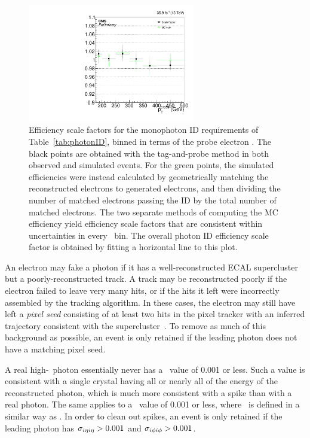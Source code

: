 \begin{figure}[hbtp]
  \begin{center}
    \includegraphics[width=0.65\textwidth]{Figures/phoID_SF.pdf}
    \caption{
    Efficiency scale factors for the monophoton ID requirements of Table~\ref{tab:photonID}, binned in terms of the probe electron \pT. The black points are obtained with the tag-and-probe method in
    both observed and simulated events. For the green points, the simulated efficiencies were instead calculated by geometrically matching the reconstructed electrons to generated electrons,
    and then dividing the number of matched electrons passing the ID by the total number of matched electrons. The two separate methods of computing the MC efficiency yield
    efficiency scale factors that are consistent within uncertainties in every \pT\ bin. The overall photon ID efficiency scale factor is obtained by fitting a horizontal line to this plot.
    }
    \label{fig:phoID_SF}
  \end{center}
\end{figure}

An electron may fake a photon if it has a well-reconstructed ECAL supercluster but a poorly-reconstructed track. A track may be reconstructed poorly if the electron failed to leave very many hits,
or if the hits it left were incorrectly assembled by the tracking algorithm. In these cases, the electron may still have left a \textit{pixel seed} consisting of at least two hits in the pixel tracker
with an inferred trajectory consistent with the supercluster~\cite{ref:1748-0221/10/08/P08010}. To remove as much of this background as possible, an event is only retained if the leading photon does
not have a matching pixel seed.

A real high-\pT\ photon essentially never has a \sieie\ value of 0.001 or less. Such a value is consistent with a single crystal having all or nearly all of the energy of the
reconstructed photon, which is much more consistent with a spike than with a real photon. The same applies to a \sipip\ value of 0.001 or less, where \sipip\ is
defined in a similar way as \sieie. In order to clean out spikes, an event is only retained if the leading photon has $\sigma_{i\eta i\eta} > 0.001$ and $\sigma_{i\phi i\phi} > 0.001$.

